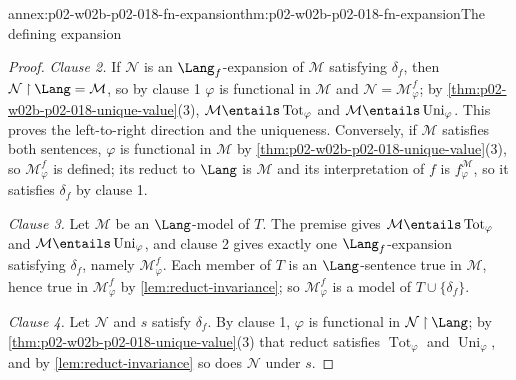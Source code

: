 \begin{annexitem}{annex:p02-w02b-p02-018-fn-expansion}{thm:p02-w02b-p02-018-fn-expansion}{The defining expansion}
\begin{proof}
\emph{Clause 2.}  If \(\mathcal N\) is an \(\Lang_f\)-expansion of
\(\mathcal M\) satisfying \(\delta_f\), then
\(\mathcal N\mathbin{\upharpoonright}\Lang=\mathcal M\), so by clause 1
\(\varphi\) is functional in \(\mathcal M\) and
\(\mathcal N=\mathcal M^{f}_{\varphi}\); by
\cref{thm:p02-w02b-p02-018-unique-value}(3),
\(\mathcal M\entails\operatorname{Tot}_{\varphi}\) and
\(\mathcal M\entails\operatorname{Uni}_{\varphi}\).  This proves the
left-to-right direction and the uniqueness.  Conversely, if \(\mathcal M\)
satisfies both sentences, \(\varphi\) is functional in \(\mathcal M\) by
\cref{thm:p02-w02b-p02-018-unique-value}(3), so \(\mathcal M^{f}_{\varphi}\)
is defined; its reduct to \(\Lang\) is \(\mathcal M\) and its interpretation
of \(f\) is \(f^{\mathcal M}_{\varphi}\), so it satisfies \(\delta_f\) by
clause 1.

\emph{Clause 3.}  Let \(\mathcal M\) be an \(\Lang\)-model of \(T\).  The
premise gives \(\mathcal M\entails\operatorname{Tot}_{\varphi}\) and
\(\mathcal M\entails\operatorname{Uni}_{\varphi}\), and clause 2 gives
exactly one \(\Lang_f\)-expansion satisfying \(\delta_f\), namely
\(\mathcal M^{f}_{\varphi}\).  Each member of \(T\) is an \(\Lang\)-sentence
true in \(\mathcal M\), hence true in \(\mathcal M^{f}_{\varphi}\) by
\cref{lem:reduct-invariance}; so \(\mathcal M^{f}_{\varphi}\) is a model of
\(T\cup\{\delta_f\}\).

\emph{Clause 4.}  Let \(\mathcal N\) and \(s\) satisfy \(\delta_f\).  By
clause 1, \(\varphi\) is functional in
\(\mathcal N\mathbin{\upharpoonright}\Lang\); by
\cref{thm:p02-w02b-p02-018-unique-value}(3) that reduct satisfies
\(\operatorname{Tot}_{\varphi}\) and \(\operatorname{Uni}_{\varphi}\), and by
\cref{lem:reduct-invariance} so does \(\mathcal N\) under \(s\).
\end{proof}
\end{annexitem}

